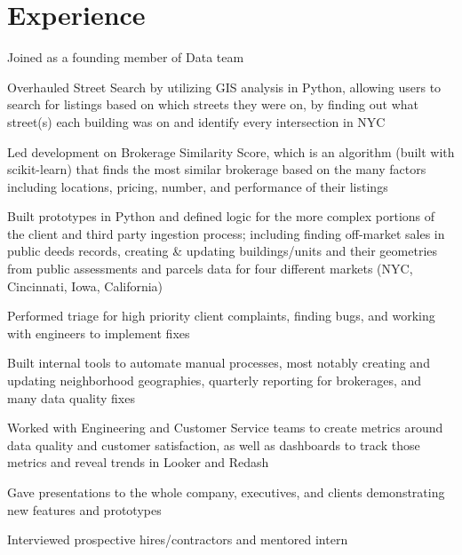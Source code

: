 \documentclass[a4paper]{deedy-resume-openfont} %
\begin{document}
\begin{minipage}[t]{0.66\textwidth} %


\section{Experience}
\vspace{\topsep} %
\begin{tightitemize}
	\item Joined as a founding member of Data team
    \item Overhauled Street Search by utilizing GIS analysis in Python, allowing users to search for listings based on which streets they were on, by finding out what street(s) each building was on and identify every intersection in NYC
    \item Led development on Brokerage Similarity Score, which is an algorithm (built with scikit-learn) that finds the most similar brokerage based on the many factors including locations, pricing, number, and performance of their listings
    \item Built prototypes in Python and defined logic for the more complex portions of the client and third party ingestion process; including finding off-market sales in public deeds records, creating \& updating buildings/units and their geometries from public assessments and parcels data for four different markets (NYC, Cincinnati, Iowa, California)
    \item Performed triage for high priority client complaints, finding bugs, and working with engineers to implement fixes
    \item Built internal tools to automate manual processes, most notably creating and updating neighborhood geographies, quarterly reporting for brokerages, and many data quality fixes
    \item Worked with Engineering and Customer Service teams to create metrics around data quality and customer satisfaction, as well as dashboards to track those metrics and reveal trends in Looker and Redash
    \item Gave presentations to the whole company, executives, and clients demonstrating new features and prototypes
    \item Interviewed prospective hires/contractors and mentored intern
\end{tightitemize}


\end{minipage}
\end{document}
